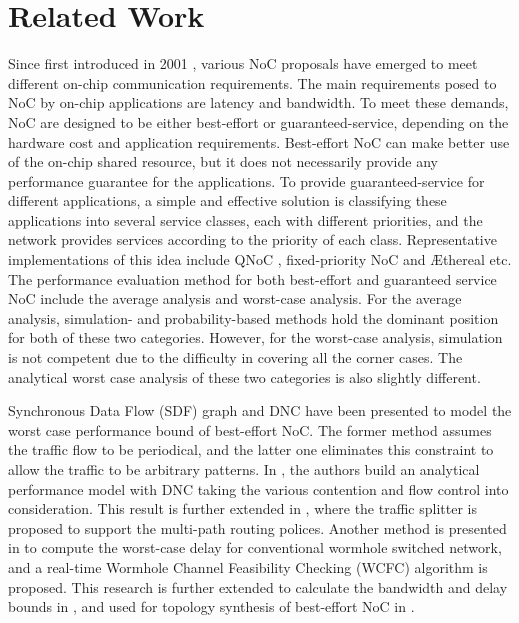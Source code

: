 \documentclass[10pt,journal]{IEEEtran}
\begin{document}
\section{Related Work}\label{related}
Since first introduced in 2001 \cite{DaTo01}, various NoC proposals have emerged to meet different on-chip communication requirements. The main requirements posed to NoC by on-chip applications are latency and bandwidth. To meet these demands, NoC are designed to be either best-effort or guaranteed-service, depending on the hardware cost and application requirements. Best-effort NoC can make better use of the on-chip shared resource, but it does not necessarily provide any performance guarantee for the applications. To provide guaranteed-service for different applications, a simple and effective solution is classifying these applications into several service classes, each with different priorities, and the network provides services according to the priority of each class. Representative implementations of this idea include QNoC \cite{BCGK04}, fixed-priority NoC \cite{Shi:2008:RCA:1397757.1397996} and {{\AE}thereal} \cite{GoDR05} etc. The performance evaluation method for both best-effort and guaranteed service NoC include the average analysis and worst-case analysis. For the average analysis, simulation- and probability-based methods hold the dominant position for both of these two categories. However, for the worst-case analysis, simulation is not competent due to the difficulty in covering all the corner cases. The analytical worst case analysis of these two categories is also slightly different.

Synchronous Data Flow (SDF) graph \cite{poplavko2003task} and DNC \cite{qian2009analysis} have been presented to model the worst case performance bound of best-effort NoC. The former method assumes the traffic flow to be periodical, and the latter one eliminates this constraint to allow the traffic to be arbitrary patterns. In \cite{qian2009analysis}, the authors build an analytical performance model with DNC taking the various contention and flow control into consideration. This result is further extended in \cite{Du:2012:WPA:2380445.2380469}, where the traffic splitter is proposed to support the multi-path routing polices. Another method is presented in \cite{Lee:2003:RWC:846077.846083} to compute the worst-case delay for conventional wormhole switched network, and a real-time Wormhole Channel Feasibility Checking (WCFC) algorithm is proposed. This research is further extended to calculate the bandwidth and delay bounds in \cite{6109240}, and used for topology synthesis of best-effort NoC in \cite{EPFL-ARTICLE-186879}.
\end{document}
